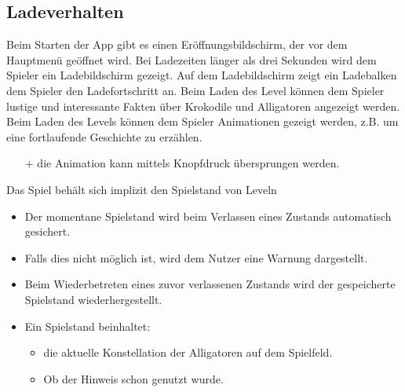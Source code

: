 \subsection{Ladeverhalten}
\begin {requirements}
	 Beim Starten der App gibt es einen Eröffnungsbildschirm, der vor dem Hauptmenü geöffnet wird.
	 Bei Ladezeiten länger als drei Sekunden wird dem Spieler ein Ladebildschirm gezeigt.
	 Auf dem Ladebildschirm zeigt ein Ladebalken dem Spieler den Ladefortschritt an.
	 Beim Laden des Level können dem Spieler lustige und interessante Fakten über Krokodile und Alligatoren angezeigt werden.
	 Beim Laden des Levels können dem Spieler Animationen gezeigt werden, z.B. um eine fortlaufende Geschichte zu erzählen.
	\begin{itemize}
		\item[+] die Animation kann mittels Knopfdruck übersprungen werden.
	\end{itemize}
	 Das Spiel behält sich implizit den Spielstand von Leveln
	\begin{itemize}
		\item Der momentane Spielstand wird beim Verlassen eines Zustands automatisch gesichert.
		\item Falls dies nicht möglich ist, wird dem Nutzer eine Warnung dargestellt.
		\item Beim Wiederbetreten eines zuvor verlassenen Zustands wird  der gespeicherte Spielstand wiederhergestellt.
		\item Ein Spielstand beinhaltet:
		\begin{itemize}
			\item die aktuelle Konstellation der Alligatoren auf dem Spielfeld.
			\item Ob der Hinweis schon genutzt wurde.
		\end{itemize}
	\end{itemize}

\end {requirements}
